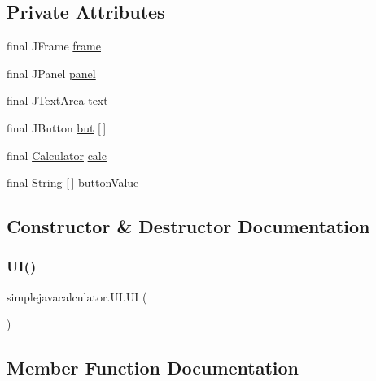 \subsection*{Private Attributes}
\begin{DoxyCompactItemize}
\item 
final J\+Frame \mbox{\hyperlink{classsimplejavacalculator_1_1_u_i_a422beb055231df38e0df51c4c57528f6}{frame}}
\item 
final J\+Panel \mbox{\hyperlink{classsimplejavacalculator_1_1_u_i_ab33ed8fbdc7da55588ca006eff0c7219}{panel}}
\item 
final J\+Text\+Area \mbox{\hyperlink{classsimplejavacalculator_1_1_u_i_ad63dddeb78adb3942b218d236236bb75}{text}}
\item 
final J\+Button \mbox{\hyperlink{classsimplejavacalculator_1_1_u_i_a8e5cc0dc1dcc16e68acc0092bba76f4d}{but}} \mbox{[}$\,$\mbox{]}
\item 
final \mbox{\hyperlink{classsimplejavacalculator_1_1_calculator}{Calculator}} \mbox{\hyperlink{classsimplejavacalculator_1_1_u_i_a7dd7594eb2a5a1ab7f5f3fc6f04749e5}{calc}}
\item 
final String \mbox{[}$\,$\mbox{]} \mbox{\hyperlink{classsimplejavacalculator_1_1_u_i_ad106f51201a2fe6e0fb7d0e37f3fd740}{button\+Value}}
\end{DoxyCompactItemize}


\subsection{Constructor \& Destructor Documentation}
\mbox{\label{classsimplejavacalculator_1_1_u_i_a18381b38a31adbe19234bffe8129627f}} 
\subsubsection{\texorpdfstring{UI()}{UI()}}
{\footnotesize\ttfamily simplejavacalculator.\+U\+I.\+UI (\begin{DoxyParamCaption}{ }\end{DoxyParamCaption})}



\subsection{Member Function Documentation}
\mbox{\label{classsimplejavacalculator_1_1_u_i_a90dee716b25c6fe985ca6258920545b3}} 
